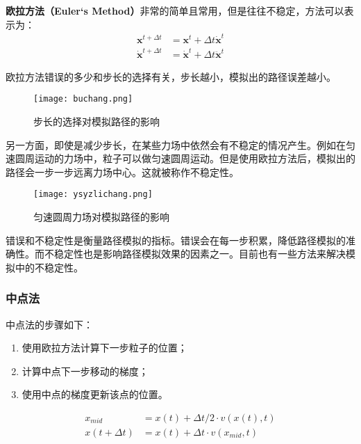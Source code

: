 \documentclass[openany]{progbookcn}
\begin{document}
\textbf{欧拉方法（Euler‘s Method）}非常的简单且常用，但是往往不稳定，方法可以表示为：
\begin{equation}
	\begin{split}
		\mathbf{x}^{t+\Delta t} &=\mathbf{x}^{t}+\Delta t \dot{\mathbf{x}}^{t} \\
		\dot{\mathbf{x}}^{t+\Delta t} &=\dot{\mathbf{x}}^{t}+\Delta t \ddot{\mathbf{x}}^{t}
	\end{split}
\end{equation}

欧拉方法错误的多少和步长的选择有关，步长越小，模拟出的路径误差越小。

\begin{figure}[H]
	\centering
	\texttt{[image: buchang.png]}
	\caption{步长的选择对模拟路径的影响}
	\label{fig:buchang}
\end{figure}

另一方面，即使是减少步长，在某些力场中依然会有不稳定的情况产生。例如在匀速圆周运动的力场中，粒子可以做匀速圆周运动。但是使用欧拉方法后，模拟出的路径会一步一步远离力场中心。这就被称作不稳定性。

\begin{figure}[H]
	\centering
	\texttt{[image: ysyzlichang.png]}
	\caption{匀速圆周力场对模拟路径的影响}
	\label{fig:ysyz}
\end{figure}

错误和不稳定性是衡量路径模拟的指标。错误会在每一步积累，降低路径模拟的准确性。而不稳定性也是影响路径模拟效果的因素之一。目前也有一些方法来解决模拟中的不稳定性。

\subsubsection{中点法}

中点法的步骤如下：
\begin{enumerate}
	\item 使用欧拉方法计算下一步粒子的位置；
	\item 计算中点下一步移动的梯度；
	\item 使用中点的梯度更新该点的位置。
\end{enumerate}

\begin{equation}
	\begin{split}
		x_{mid} &=x(t)+\Delta t / 2 \cdot v(x(t), t) \\
		x(t+\Delta t) &=x(t)+\Delta t \cdot v\left(x_{mid}, t\right)
	\end{split}
\end{equation}
\end{document}
